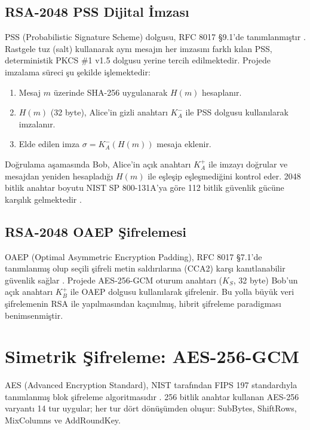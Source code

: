 	\subsection{RSA-2048 PSS Dijital İmzası}

PSS (Probabilistic Signature Scheme) dolgusu, RFC 8017 §9.1'de tanımlanmıştır \cite{RFC8017}. Rastgele tuz (salt) kullanarak aynı mesajın her imzasını farklı kılan PSS, deterministik PKCS \#1 v1.5 dolgusu yerine tercih edilmektedir. Projede imzalama süreci şu şekilde işlemektedir:

\begin{enumerate}
    \item Mesaj $m$ üzerinde SHA-256 uygulanarak $H(m)$ hesaplanır.
    \item $H(m)$ (32 byte), Alice'in gizli anahtarı $K^-_A$ ile PSS dolgusu kullanılarak imzalanır.
    \item Elde edilen imza $\sigma = K^-_A(H(m))$ mesaja eklenir.
\end{enumerate}

Doğrulama aşamasında Bob, Alice'in açık anahtarı $K^+_A$ ile imzayı doğrular ve mesajdan yeniden hesapladığı $H(m)$ ile eşleşip eşleşmediğini kontrol eder. 2048 bitlik anahtar boyutu NIST SP 800-131A'ya göre 112 bitlik güvenlik gücüne karşılık gelmektedir \cite{SP800131A}.

	\subsection{RSA-2048 OAEP Şifrelemesi}

OAEP (Optimal Asymmetric Encryption Padding), RFC 8017 §7.1'de tanımlanmış olup seçili şifreli metin saldırılarına (CCA2) karşı kanıtlanabilir güvenlik sağlar \cite{RFC8017}. Projede AES-256-GCM oturum anahtarı ($K_S$, 32 byte) Bob'un açık anahtarı $K^+_B$ ile OAEP dolgusu kullanılarak şifrelenir. Bu yolla büyük veri şifrelemenin RSA ile yapılmasından kaçınılmış, hibrit şifreleme paradigması benimsenmiştir.

	\section{Simetrik Şifreleme: AES-256-GCM}

AES (Advanced Encryption Standard), NIST tarafından FIPS 197 standardıyla tanımlanmış blok şifreleme algoritmasıdır \cite{FIPS197}. 256 bitlik anahtar kullanan AES-256 varyantı 14 tur uygular; her tur dört dönüşümden oluşur: SubBytes, ShiftRows, MixColumns ve AddRoundKey.

